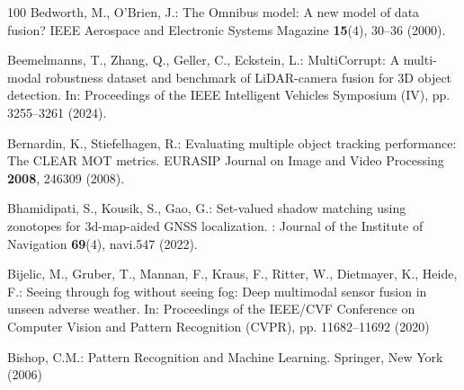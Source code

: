 \documentclass[graybox,envcountchap]{style/SNmono}
\begin{document}
\begin{thebibliography}{100}
Bedworth, M., O'Brien, J.: The {Omnibus} model: A new model of data fusion?
\newblock IEEE Aerospace and Electronic Systems Magazine \textbf{15}(4), 30--36
  (2000).
\newblock {}



Beemelmanns, T., Zhang, Q., Geller, C., Eckstein, L.: {MultiCorrupt}: A
  multi-modal robustness dataset and benchmark of {LiDAR}-camera fusion for
  {3D} object detection.
\newblock In: Proceedings of the IEEE Intelligent Vehicles Symposium (IV), pp.
  3255--3261 (2024).
\newblock {}



Bernardin, K., Stiefelhagen, R.: Evaluating multiple object tracking
  performance: The {CLEAR MOT} metrics.
\newblock EURASIP Journal on Image and Video Processing \textbf{2008}, 246309
  (2008).
\newblock {}



Bhamidipati, S., Kousik, S., Gao, G.: Set-valued shadow matching using
  zonotopes for 3d-map-aided {GNSS} localization.
: Journal of the Institute of Navigation \textbf{69}(4),
  navi.547 (2022).
\newblock {}


{\color{red} 
Bijelic, M., Gruber, T., Mannan, F., Kraus, F., Ritter, W., Dietmayer, K.,
  Heide, F.: Seeing through fog without seeing fog: Deep multimodal sensor
  fusion in unseen adverse weather.
\newblock In: Proceedings of the IEEE/CVF Conference on Computer Vision and
  Pattern Recognition (CVPR), pp. 11682--11692 (2020)

\par}
{\color{red} 
Bishop, C.M.: Pattern Recognition and Machine Learning.
\newblock Springer, New York (2006)

\par}
\end{thebibliography}
\end{document}
